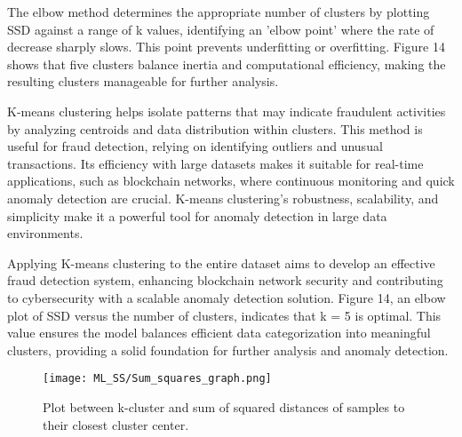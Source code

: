 \documentclass[journal]{IEEEtran}
\begin{document}
The elbow method determines the appropriate number of clusters by plotting SSD against a range of k values, identifying an 'elbow point' where the rate of decrease sharply slows. This point prevents underfitting or overfitting. Figure 14 shows that five clusters balance inertia and computational efficiency, making the resulting clusters manageable for further analysis.

K-means clustering helps isolate patterns that may indicate fraudulent activities by analyzing centroids and data distribution within clusters. This method is useful for fraud detection, relying on identifying outliers and unusual transactions. Its efficiency with large datasets makes it suitable for real-time applications, such as blockchain networks, where continuous monitoring and quick anomaly detection are crucial. K-means clustering's robustness, scalability, and simplicity make it a powerful tool for anomaly detection in large data environments.

Applying K-means clustering to the entire dataset aims to develop an effective fraud detection system, enhancing blockchain network security and contributing to cybersecurity with a scalable anomaly detection solution. Figure 14, an elbow plot of SSD versus the number of clusters, indicates that k = 5 is optimal. This value ensures the model balances efficient data categorization into meaningful clusters, providing a solid foundation for further analysis and anomaly detection.

\begin{figure}[h!] %
    \centering
    \texttt{[image: ML\_SS/Sum\_squares\_graph.png]}  %
    \caption{Plot between k-cluster and sum of squared distances of samples to their closest cluster center.}
    \label{fig:autoencoder-structure}
\end{figure}
\end{document}
